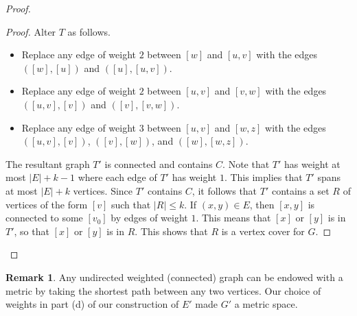 \documentclass[10pt,letterpaper,cm]{nupset}
\theoremstyle{definition}
\newtheorem{remark}{Remark}
\newcommand{\1}{\mathbf{1}}
\newcommand{\0}{\vec 0}
\begin{document}
\begin{proof}
\begin{proof}
Alter $T$ as follows.
\begin{itemize}
\item Replace any edge of weight $2$ between $[w]$ and $[u,v]$ with the edges $([w], [u])$ and $([u], [u,v])$.
\item Replace any edge of weight $2$ between $[u,v]$ and $[v,w]$ with the edges $([u,v], [v])$ and $([v], [v,w])$.
\item Replace any edge of weight $3$ between $[u,v]$ and $[w,z]$ with the edges $([u,v], [v])$, $([v], [w])$, and $([w], [w,z])$.
\end{itemize}
The resultant graph $T'$ is connected and contains $C$. Note that $T'$ has weight at most $|E| + k -1$ where each edge of $T'$ has weight $1$. This implies that $T'$ spans at most $|E| +k$ vertices. Since $T'$ contains $C$, it follows that $T'$ contains a set $R$ of vertices of the form $[v]$ such that $|R|\leq k$. If $(x,y)\in E$, then $[x,y]$ is connected to some $[v_0]$ by edges of weight $1$. This means that $[x]$ or $[y]$ is in $T'$, so that $[x]$ or $[y]$ is in $R$. This shows that $R$ is a vertex cover for $G$.
\end{proof}
\end{proof}

\begin{remark}
Any undirected  weighted (connected) graph can be endowed with a metric by taking the shortest path between any two vertices. Our choice of weights in part (d) of our construction of $E'$ made $G'$ a metric space. 
\end{remark}
\end{document}
